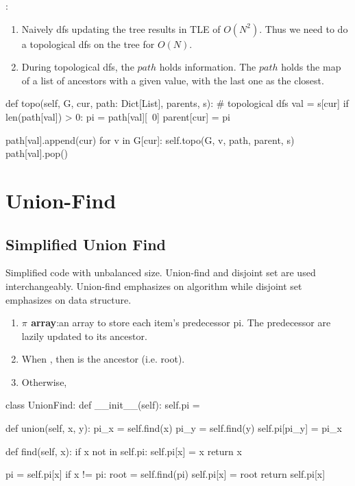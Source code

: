 :
\begin{enumerate}
\item Naively dfs updating the tree results in TLE of $O(N^2)$. Thus we need to do a topological dfs on the tree for $O(N)$.
\item During topological dfs, the $path$ holds  information. The $path$ holds the map of a list of ancestors with a given value, with the last one as the closest. 
\end{enumerate}
\begin{python}
def topo(self, G, cur, path: Dict[List], parents, s):
    # topological dfs
    val = s[cur]
    if len(path[val]) > 0:
        pi = path[val][~0]
        parent[cur] = pi
    
    path[val].append(cur)
    for v in G[cur]:
        self.topo(G, v, path, parent, s)
    path[val].pop()
\end{python}


\section{Union-Find}\label{section:unionFind}
\subsection{Simplified Union Find}
Simplified code with unbalanced size. Union-find and disjoint set are used interchangeably. Union-find emphasizes on algorithm while disjoint set emphasizes on data structure.

\begin{enumerate}
\item \textbf{$\pi$ array}:an array to store each item's predecessor pi. The predecessor are lazily updated to its ancestor. 
\item When , then  is the ancestor (i.e. root).
\item Otherwise, 
\end{enumerate}
\begin{python}
class UnionFind:
    def __init__(self):
        self.pi = {}

    def union(self, x, y):
        pi_x = self.find(x)
        pi_y = self.find(y)
        self.pi[pi_y] = pi_x

    def find(self, x):
        if x not in self.pi:
          self.pi[x] = x
          return x
        
        pi = self.pi[x]
        if x != pi:
          root = self.find(pi)
          self.pi[x] = root
        return self.pi[x]
\end{python}

